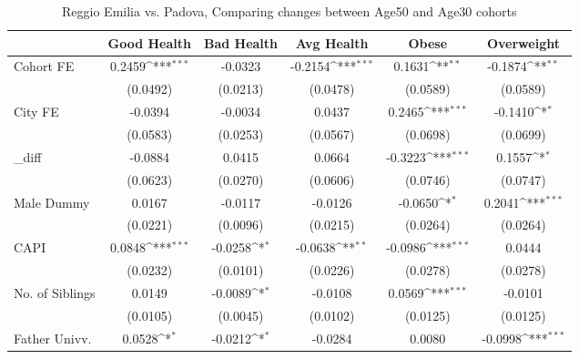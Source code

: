 \begin{table}[htbp]\centering
\def\sym#1{\ifmmode^{#1}\else\(^{#1}\)\fi}
\caption{Reggio Emilia vs. Padova, Comparing changes between Age50 and Age30 cohorts}
\begin{tabular}{l*{5}{c}}
\toprule
            &\multicolumn{1}{c}{Good Health}&\multicolumn{1}{c}{Bad Health}&\multicolumn{1}{c}{Avg Health}&\multicolumn{1}{c}{Obese}&\multicolumn{1}{c}{Overweight}\\
\midrule
Cohort FE   &      0.2459\sym{***}&     -0.0323         &     -0.2154\sym{***}&      0.1631\sym{**} &     -0.1874\sym{**} \\
            &    (0.0492)         &    (0.0213)         &    (0.0478)         &    (0.0589)         &    (0.0589)         \\
\addlinespace
City FE     &     -0.0394         &     -0.0034         &      0.0437         &      0.2465\sym{***}&     -0.1410\sym{*}  \\
            &    (0.0583)         &    (0.0253)         &    (0.0567)         &    (0.0698)         &    (0.0699)         \\
\addlinespace
\_diff       &     -0.0884         &      0.0415         &      0.0664         &     -0.3223\sym{***}&      0.1557\sym{*}  \\
            &    (0.0623)         &    (0.0270)         &    (0.0606)         &    (0.0746)         &    (0.0747)         \\
\addlinespace
Male Dummy  &      0.0167         &     -0.0117         &     -0.0126         &     -0.0650\sym{*}  &      0.2041\sym{***}\\
            &    (0.0221)         &    (0.0096)         &    (0.0215)         &    (0.0264)         &    (0.0264)         \\
\addlinespace
CAPI        &      0.0848\sym{***}&     -0.0258\sym{*}  &     -0.0638\sym{**} &     -0.0986\sym{***}&      0.0444         \\
            &    (0.0232)         &    (0.0101)         &    (0.0226)         &    (0.0278)         &    (0.0278)         \\
\addlinespace
No. of Siblings&      0.0149         &     -0.0089\sym{*}  &     -0.0108         &      0.0569\sym{***}&     -0.0101         \\
            &    (0.0105)         &    (0.0045)         &    (0.0102)         &    (0.0125)         &    (0.0125)         \\
\addlinespace
Father Univv.&      0.0528\sym{*}  &     -0.0212\sym{*}  &     -0.0284         &      0.0080         &     -0.0998\sym{***}\\

\end{tabular}
\end{table}

